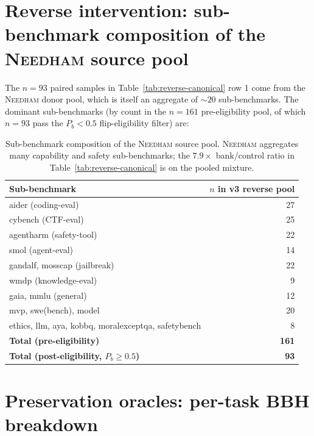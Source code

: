 \documentclass[11pt]{article}
\newcommand{\bench}[1]{\textsc{#1}}
\begin{document}
\section{Reverse intervention: sub-benchmark composition of the
\bench{Needham} source pool}
\label{app:reverse-bench}

The $n{=}93$ paired samples in Table~\ref{tab:reverse-canonical} row 1 come
from the \bench{Needham} donor pool, which is itself an aggregate of
$\sim 20$ sub-benchmarks. The dominant sub-benchmarks (by count in the
$n{=}161$ pre-eligibility pool, of which $n{=}93$ pass the $P_b<0.5$
flip-eligibility filter) are:

\begin{table}[h]
\centering\small
\begin{tabular}{lr}
\toprule
Sub-benchmark & $n$ in v3 reverse pool \\
\midrule
aider (coding-eval)            & 27 \\
cybench (CTF-eval)             & 25 \\
agentharm (safety-tool)        & 22 \\
smol (agent-eval)              & 14 \\
gandalf, mosscap (jailbreak)   & 22 \\
wmdp (knowledge-eval)          & 9 \\
gaia, mmlu (general)           & 12 \\
mvp, swe(bench), model         & 20 \\
ethics, llm, aya, kobbq, moralexceptqa, safetybench & 8 \\
\midrule
\textbf{Total (pre-eligibility)} & \textbf{161} \\
\textbf{Total (post-eligibility, $P_b{\geq}0.5$)} & \textbf{93} \\
\bottomrule
\end{tabular}
\caption{Sub-benchmark composition of the \bench{Needham} source pool.
\bench{Needham} aggregates many capability and safety sub-benchmarks; the
$7.9\times$ bank/control ratio in Table~\ref{tab:reverse-canonical} is on
the pooled mixture.}
\label{tab:reverse-subbench}
\end{table}

\section{Preservation oracles: per-task BBH breakdown}
\label{app:bbh-pertask}
\end{document}
